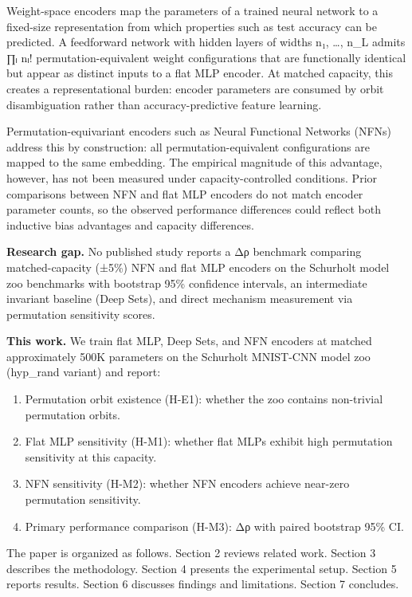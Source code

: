 
Weight-space encoders map the parameters of a trained neural network to a fixed-size representation from which properties such as test accuracy can be predicted. A feedforward network with hidden layers of widths n₁, …, n_L admits ∏ₗ nₗ! permutation-equivalent weight configurations that are functionally identical but appear as distinct inputs to a flat MLP encoder. At matched capacity, this creates a representational burden: encoder parameters are consumed by orbit disambiguation rather than accuracy-predictive feature learning.

Permutation-equivariant encoders such as Neural Functional Networks (NFNs) address this by construction: all permutation-equivalent configurations are mapped to the same embedding. The empirical magnitude of this advantage, however, has not been measured under capacity-controlled conditions. Prior comparisons between NFN and flat MLP encoders do not match encoder parameter counts, so the observed performance differences could reflect both inductive bias advantages and capacity differences.

\textbf{Research gap.} No published study reports a Δρ benchmark comparing matched-capacity (±5\%) NFN and flat MLP encoders on the Schurholt model zoo benchmarks with bootstrap 95\% confidence intervals, an intermediate invariant baseline (Deep Sets), and direct mechanism measurement via permutation sensitivity scores.

\textbf{This work.} We train flat MLP, Deep Sets, and NFN encoders at matched approximately 500K parameters on the Schurholt MNIST-CNN model zoo (hyp_rand variant) and report:

\begin{enumerate}
\item Permutation orbit existence (H-E1): whether the zoo contains non-trivial permutation orbits.
\item Flat MLP sensitivity (H-M1): whether flat MLPs exhibit high permutation sensitivity at this capacity.
\item NFN sensitivity (H-M2): whether NFN encoders achieve near-zero permutation sensitivity.
\item Primary performance comparison (H-M3): Δρ with paired bootstrap 95\% CI.
\end{enumerate}

The paper is organized as follows. Section 2 reviews related work. Section 3 describes the methodology. Section 4 presents the experimental setup. Section 5 reports results. Section 6 discusses findings and limitations. Section 7 concludes.

